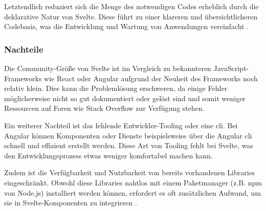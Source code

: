 Letztendlich reduziert sich die Menge des notwendigen Codes erheblich durch die deklarative Natur von Svelte. Diese führt zu einer klareren und übersichtlicheren Codebasis, was die Entwicklung und Wartung von Anwendungen vereinfacht \autocite{SvelteExperienceBespoyasov}.

\subsubsection{Nachteile}

Die Community-Größe von Svelte ist im Vergleich zu bekannteren JavaScript-Frameworks wie React oder Angular aufgrund der Neuheit des Frameworks noch relativ klein. Dies kann die Problemlösung erschweren, da einige Fehler möglicherweise nicht so gut dokumentiert oder gelöst sind und somit weniger Ressourcen auf Foren wie Stack Overflow zur Verfügung stehen.

Ein weiterer Nachteil ist das fehlende Entwickler-Tooling oder eine \ac{cli}. Bei Angular können Komponenten oder Dienste beispielsweise über die Angular \ac{cli} schnell und effizient erstellt werden. Diese Art von Tooling fehlt bei Svelte, was den Entwicklungsprozess etwas weniger komfortabel machen kann.

Zudem ist die Verfügbarkeit und Nutzbarkeit von bereits vorhandenen Libraries eingeschränkt. Obwohl diese Libraries nahtlos mit einem Paketmanager (z.B. npm von Node.js) installiert werden können, erfordert es oft zusätzlichen Aufwand, um sie in Svelte-Komponenten zu integrieren \autocite{SvelteVsSvelteKit2023}.